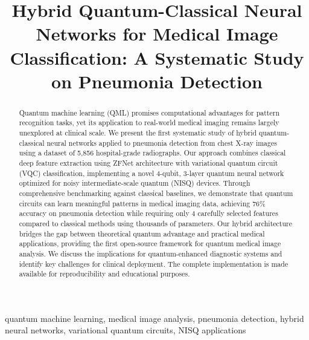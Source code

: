 \documentclass[conference]{IEEEtran}
\begin{document}
\title{Hybrid Quantum-Classical Neural Networks for Medical Image Classification: A Systematic Study on Pneumonia Detection}

\author{
\and
{}
}

\maketitle

\begin{abstract}
Quantum machine learning (QML) promises computational advantages for pattern recognition tasks, yet its application to real-world medical imaging remains largely unexplored at clinical scale. We present the first systematic study of hybrid quantum-classical neural networks applied to pneumonia detection from chest X-ray images using a dataset of 5,856 hospital-grade radiographs. Our approach combines classical deep feature extraction using ZFNet architecture with variational quantum circuit (VQC) classification, implementing a novel 4-qubit, 3-layer quantum neural network optimized for noisy intermediate-scale quantum (NISQ) devices. Through comprehensive benchmarking against classical baselines, we demonstrate that quantum circuits can learn meaningful patterns in medical imaging data, achieving 76\% accuracy on pneumonia detection while requiring only 4 carefully selected features compared to classical methods using thousands of parameters. Our hybrid architecture bridges the gap between theoretical quantum advantage and practical medical applications, providing the first open-source framework for quantum medical image analysis. We discuss the implications for quantum-enhanced diagnostic systems and identify key challenges for clinical deployment. The complete implementation is made available for reproducibility and educational purposes.
\end{abstract}

\begin{IEEEkeywords}
quantum machine learning, medical image analysis, pneumonia detection, hybrid neural networks, variational quantum circuits, NISQ applications
\end{IEEEkeywords}
\end{document}

